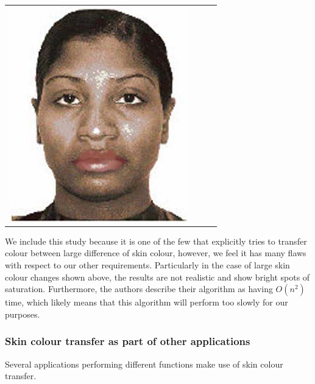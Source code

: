 \begin{longtable}{|N||c|c|c|}
\begin{minipage}{.29\textwidth}
    \includegraphics[width=\textwidth,height=\textheight,keepaspectratio]{images/yin_result1}
  \end{minipage} \\
\end{longtable}

We include this study because it is one of the few that explicitly tries to transfer colour between large difference of skin colour, however, we feel it has many flaws with respect to our other requirements. Particularly in the case of large skin colour changes shown above, the results are not realistic and show bright spots of saturation. Furthermore, the authors describe their algorithm as having $O(n^2)$ time, which likely means that this algorithm will perform too slowly for our purposes.



\subsubsection{Skin colour transfer as part of other applications}
Several applications performing different functions make use of skin colour transfer.

